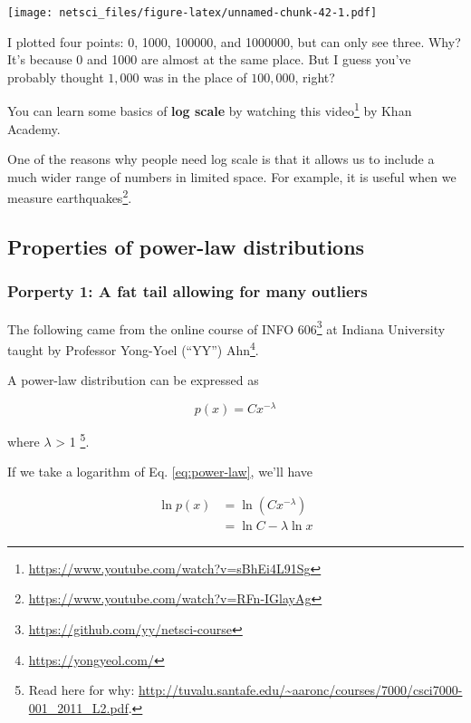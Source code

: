 \documentclass[
]{krantz}
\makeatletter
\renewcommand{\href}[2]{#2\footnote{\url{#1}}}
\newenvironment{kframe}{%
\medskip{}
\setlength{\fboxsep}{.8em}
 \def\at@end@of@kframe{}%
 \ifinner\ifhmode%
  \def\at@end@of@kframe{\end{minipage}}%
  \begin{minipage}{\columnwidth}%
 \fi\fi%
 \def\FrameCommand##1{\hskip\@totalleftmargin \hskip-\fboxsep
 \colorbox{shadecolor}{##1}\hskip-\fboxsep
     \hskip-\linewidth \hskip-\@totalleftmargin \hskip\columnwidth}%
 \MakeFramed {\advance\hsize-\width
   \@totalleftmargin\z@ \linewidth\hsize
   \@setminipage}}%
 {\par\unskip\endMakeFramed%
 \at@end@of@kframe}
\newenvironment{rmdblock}[1]
  {
  \begin{itemize}
  \renewcommand{\labelitemi}{
    \raisebox{-.7\height}[0pt][0pt]{
      {\setkeys{Gin}{width=3em,keepaspectratio}\texttt{[image: images/\#1]}}
    }
  }
  \setlength{\fboxsep}{1em}
  \begin{kframe}
  \item
  }
  {
  \end{kframe}
  \end{itemize}
  }
\newenvironment{rmdnote}
  {\begin{rmdblock}{note}}
  {\end{rmdblock}}
\makeatother
\begin{document}
\texttt{[image: netsci\_files/figure-latex/unnamed-chunk-42-1.pdf]}

I plotted four points: 0, 1000, 100000, and 1000000, but can only see three. Why? It's because 0 and 1000 are almost at the same place. But I guess you've probably thought \(1,000\) was in the place of \(100,000\), right?

You can learn some basics of \textbf{log scale} by watching \href{https://www.youtube.com/watch?v=sBhEi4L91Sg}{this video} by Khan Academy.

One of the reasons why people need log scale is that it allows us to include a much wider range of numbers in limited space. For example, it is useful \href{https://www.youtube.com/watch?v=RFn-IGlayAg}{when we measure earthquakes}.

\hypertarget{properties-of-power-law-distributions}{%
\subsection{Properties of power-law distributions}\label{properties-of-power-law-distributions}}

\hypertarget{porperty-1-a-fat-tail-allowing-for-many-outliers}{%
\subsubsection{Porperty 1: A fat tail allowing for many outliers}\label{porperty-1-a-fat-tail-allowing-for-many-outliers}}

\begin{rmdnote}
The following came from the online course of \href{https://github.com/yy/netsci-course}{INFO 606} at Indiana University taught by Professor \href{https://yongyeol.com/}{Yong-Yoel (``YY'') Ahn}.
\end{rmdnote}

A power-law distribution can be expressed as

\begin{equation} 
  p(x) = Cx^{-\lambda} \label{eq:power-law}
\end{equation}

where \(\lambda\) \textgreater{} 1 \footnote{Read here for why: \url{http://tuvalu.santafe.edu/~aaronc/courses/7000/csci7000-001_2011_L2.pdf}.}.

If we take a logarithm of Eq. \eqref{eq:power-law}, we'll have

\begin{align} 
  \ln p(x) & =  \ln (Cx^{-\lambda}) \\
  & = \ln C -\lambda \ln x \label{eq:power-law-simplified}
\end{align}
\end{document}
